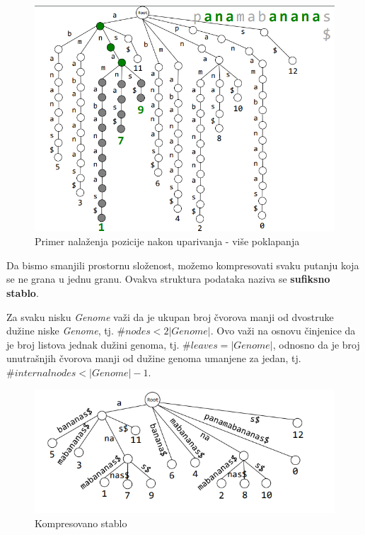 \begin{figure}[h!]
\centering
\includegraphics[scale=0.5]{poglavlja/9/slike/sufiksnoStabloNaciIndeksPocetkaVise.png}
\caption{Primer nalaženja pozicije nakon uparivanja - više poklapanja}
\end{figure}

\clearpage
Da bismo smanjili prostornu složenost, možemo kompresovati svaku putanju koja se ne grana u jednu granu. Ovakva struktura podataka naziva se \textbf{sufiksno stablo}.


Za svaku nisku \textit{Genome} važi da je ukupan broj čvorova manji od dvostruke dužine niske \textit{Genome}, tj. $\# nodes < 2|Genome|$. Ovo važi na osnovu činjenice da je broj listova jednak dužini genoma, tj. $\# leaves = |Genome|$, odnosno da je broj unutrašnjih čvorova manji od dužine genoma umanjene za jedan, tj. $\# internal nodes < |Genome| - 1$.

\begin{figure}[h!]
\centering
\includegraphics[scale=0.5]{poglavlja/9/slike/sufiksnoStabloKompresovano.png}
\caption{Kompresovano stablo}
\label{slika:X}
\end{figure}

